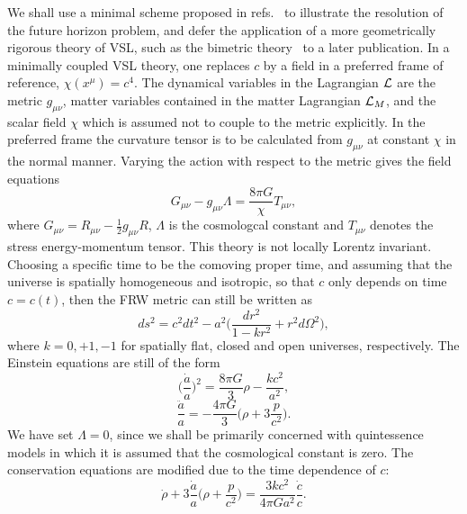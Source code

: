 \documentclass[a4paper,12pt]{article}
\begin{document}
We shall use a minimal scheme proposed in
refs.~\cite{Albrecht,Barrow,Barrow2} to illustrate the resolution of the
future horizon problem, and defer the application of a more geometrically
rigorous theory of VSL, such as the bimetric
theory~\cite{Clayton,Drummond,Liberati} to a later publication. In a
minimally coupled VSL theory, one replaces $c$ by a field in a preferred
frame of reference, $\chi(x^\mu)=c^4$. The dynamical variables in the
Lagrangian ${\cal L}$ are the metric $g_{\mu\nu}$, matter variables
contained in the matter Lagrangian ${\cal L}_M$, and the scalar field
$\chi$ which is assumed not to couple to the metric explicitly. In the
preferred frame the curvature tensor is to be calculated from $g_{\mu\nu}$
at constant $\chi$ in the normal manner. Varying the action with respect to
the metric gives the field equations
\begin{equation}
G_{\mu\nu}-g_{\mu\nu}\Lambda=\frac{8\pi G}{\chi}T_{\mu\nu},
\end{equation}
where $G_{\mu\nu}=R_{\mu\nu}-\frac{1}{2}g_{\mu\nu}R$, $\Lambda$ is the
cosmologcal constant and $T_{\mu\nu}$ denotes the stress energy-momentum
tensor. This theory is not locally Lorentz invariant. Choosing a specific
time to be the comoving proper time, and assuming that the universe is
spatially homogeneous and isotropic, so that $c$ only depends on time
$c=c(t)$, then the FRW metric can still be written as
\begin{equation}
ds^2=c^2dt^2-a^2\biggl(\frac{dr^2}{1-kr^2}+r^2d\Omega^2\biggr),
\end{equation}
where $k=0,+1,-1$ for spatially flat, closed and open
universes, respectively. The Einstein equations are still of the form
\begin{equation}
\biggl(\frac{{\dot a}}{a}\biggr)^2=\frac{8\pi
G}{3}\rho-\frac{kc^2}{a^2},
\end{equation}
\begin{equation}
\label{accelerationeq} \frac{{\ddot a}}{a}=-\frac{4\pi
G}{3}\biggl(\rho+3\frac{p}{c^2}\biggr).
\end{equation}
We have set
$\Lambda=0$, since we shall be primarily concerned with quintessence
models in which it is assumed that the cosmological constant is zero. The
conservation equations are modified due to the time dependence of $c$:
\begin{equation}
\label{conservationeq} {\dot\rho}+3\frac{{\dot
a}}{a}\biggl(\rho+\frac{p}{c^2}\biggr) =\frac{3kc^2}{4\pi Ga^2} \frac{{\dot
c}}{c}.
\end{equation}
\end{document}
